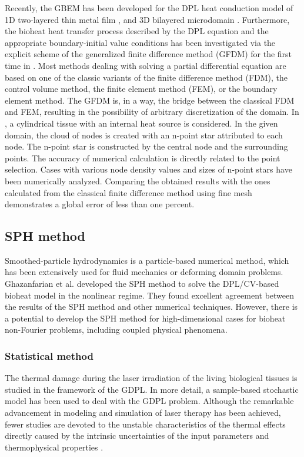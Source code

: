 \documentclass[sn-mathphys]{sn-jnl}%
\theoremstyle{thmstyleone}%
\theoremstyle{thmstyletwo}%
\theoremstyle{thmstylethree}%
\begin{document}
{Recently, the GBEM has been developed for the DPL heat conduction model of 1D two-layered thin metal film \cite{Majchrzak2020}, and 3D bilayered microdomain \cite{EMajchrzak2019}. Furthermore, the bioheat heat transfer process described by the DPL equation and the appropriate boundary-initial value conditions has been investigated via the explicit scheme of the generalized finite difference method (GFDM) for the first time in \cite{LTurchan2017}. Most methods dealing with solving a partial differential equation are based on one of the classic variants of the finite difference method (FDM), the control volume method, the finite element method (FEM), or the boundary element method. The GFDM is, in a way, the bridge between the classical FDM and FEM, resulting in the possibility of arbitrary discretization of the domain. In \cite{LTurchan2017}, a cylindrical tissue with an internal heat source is considered. In the given domain, the cloud of nodes is created with an n-point star attributed to each node.
The n-point star is constructed by the central node and the surrounding points. The accuracy of numerical calculation is directly related to the point selection. Cases with various node density values and sizes of n-point stars have been numerically analyzed. Comparing the obtained results with the ones calculated from the classical finite difference method using fine mesh demonstrates a global error of less than one percent. 

\subsection{SPH method}
Smoothed-particle hydrodynamics is a particle-based numerical method, which has been extensively used for fluid mechanics or deforming domain problems. Ghazanfarian et al. \cite{Ghazanfarian20152} developed the SPH method to solve the DPL/CV-based bioheat model in the nonlinear regime. They found excellent agreement between the results of the SPH method and other numerical techniques. However, there is a potential to develop the SPH method for high-dimensional cases for bioheat non-Fourier problems, including coupled physical phenomena.


\subsubsection{Statistical method}
The thermal damage during the laser irradiation of the living biological tissues is studied in the framework of the GDPL. In more detail, a sample-based stochastic model has been used to deal with the GDPL problem. Although the remarkable advancement in modeling and simulation of laser therapy has been achieved, fewer studies are devoted to the unstable characteristics of the thermal effects directly caused by the intrinsic uncertainties of the input parameters and thermophysical properties \cite{Afrin2017}.

}
\end{document}
